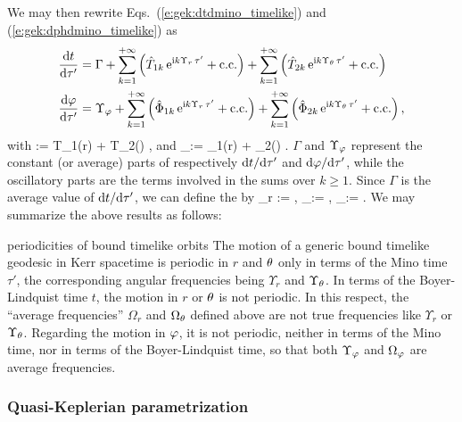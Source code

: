 We may then rewrite Eqs.~(\ref{e:gek:dtdmino_timelike}) and (\ref{e:gek:dphdmino_timelike})
as
\begin{subequations}
\begin{align}
 & \frac{\mathrm{d} t}{\mathrm{d} \tau'} = \Gamma + \sum_{k=1}^{+\infty} \left( \hat{T}_{1k} \, \mathrm{e}^{\mathrm{i} k \Upsilon_r \, \tau'} + \mathrm{c.c.} \right)
    + \sum_{k=1}^{+\infty} \left( \hat{T}_{2k} \, \mathrm{e}^{\mathrm{i} k \Upsilon_\theta \, \tau'} + \mathrm{c.c.} \right) \\
 & \frac{\mathrm{d} \varphi}{\mathrm{d} \tau'} = \Upsilon_\varphi + \sum_{k=1}^{+\infty} \left( \hat{\Phi}_{1k} \, \mathrm{e}^{\mathrm{i} k \Upsilon_r \, \tau'} + \mathrm{c.c.} \right)
 + \sum_{k=1}^{+\infty} \left( \hat{\Phi}_{2k} \, \mathrm{e}^{\mathrm{i} k \Upsilon_\theta \, \tau'} + \mathrm{c.c.} \right) ,
\end{align}
\end{subequations}
with
\be
    \Gamma := \langle T_1(r) \rangle + \langle T_2(\th) \rangle ,
\ee
and
\be
    \Upsilon_\ph :=  \langle \Phi_1(r) \rangle + \langle \Phi_2(\th) \rangle .
\ee
$\Gamma$ and $\Upsilon_\varphi$ represent the constant (or average) parts of
respectively $\mathrm{d} t/\mathrm{d}\tau'$ and $\mathrm{d} \varphi / \mathrm{d}\tau'$, while the oscillatory parts
are the terms involved in the sums over $k\geq 1$.
Since $\Gamma$ is the average value of $\mathrm{d} t/\mathrm{d}\tau'$,
we can define the
by \cite{DrascH04,FujitH09}
\be
    \Omega_r := ,\qquad
    \Omega_\th := \frac{\Upsilon_\th}{\Gamma}, \qquad
    \Omega_\ph := \frac{\Upsilon_\ph}{\Gamma} .
\ee
We may summarize the above results as follows:
\begin{tprop}{periodicities of bound timelike orbits}{}
The motion of a generic bound timelike
geodesic in Kerr spacetime is periodic in $r$ and $\theta$
only in terms of the Mino time $\tau'$, the corresponding angular frequencies
being $\Upsilon_r$ and $\Upsilon_\theta$. In terms of the Boyer-Lindquist time
$t$, the motion in $r$ or $\theta$ is not periodic. In this respect, the ``average
frequencies'' $\Omega_r$ and $\Omega_\theta$ defined above are not true
frequencies like $\Upsilon_r$ or $\Upsilon_\theta$.
Regarding the motion in $\varphi$,
it is not periodic, neither in terms of the Mino time, nor in terms
of the Boyer-Lindquist time, so that both $\Upsilon_\varphi$ and $\Omega_\varphi$
are average frequencies.
\end{tprop}

\subsubsection{Quasi-Keplerian parametrization}


